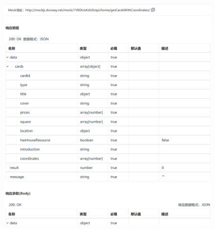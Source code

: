     \begin{figure}[h]
        \centering
        \includegraphics[height=17.0cm,width=14.0cm]{design/image/api5.png} 
        \end{figure}    
    \newpage    
